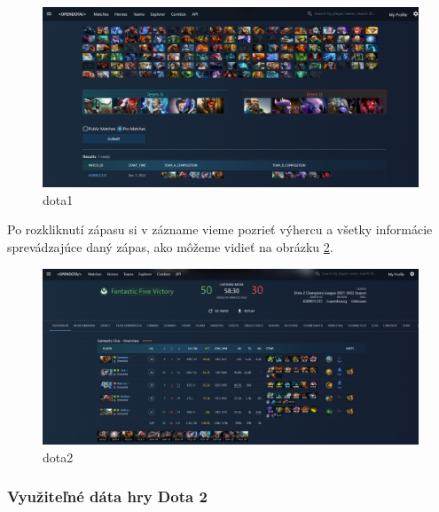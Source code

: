  \begin{figure}[h!]
	\includegraphics[width=.9\textwidth]{figures/dota1}
	\centering
	\caption{ dota1 \label{dota1}}
	
\end{figure}

Po rozkliknutí zápasu si v zázname vieme pozrieť výhercu a všetky informácie sprevádzajúce daný zápas, ako môžeme vidieť na obrázku \ref{dota2}.

 \begin{figure}[h!]
	
	\includegraphics[width=.9\textwidth]{figures/dota2}
	\centering
	\caption{ dota2 \label{dota2}}
	
\end{figure}

\subsubsection{Využiteľné dáta hry Dota 2}

